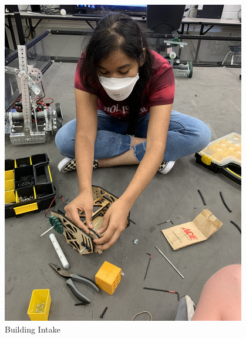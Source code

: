 \begin{figure}[ht]
\centering
\begin{minipage}[b]{.48\textwidth}
  \centering
  \includegraphics[width=0.95\textwidth]{Meetings/August/08-24-21/8-24-21_Hardware_Image3 - Nathan Forrer.JPG}
  \caption{Building Intake}
  \label{fig:pic3}
\end{minipage}%
\hfill%
\begin{minipage}[b]{.48\textwidth}
  \centering

\end{minipage}
\end{figure}
